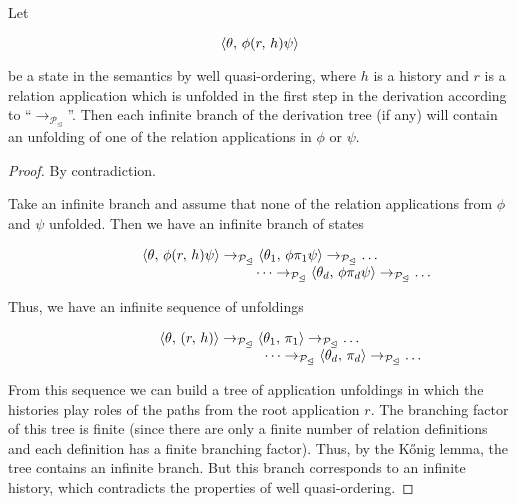 \begin{lemma}
  \label{lem:one-step-liveness}
  Let

  \[
  \langle \theta,\, \phi (r,\, h) \psi \rangle
  \]

  be a state in the semantics by well quasi-ordering, where $h$ is a history and $r$ is a relation application which
  is unfolded in the first step in the derivation according to  ``$\rightarrow_{\mathcal{P}_\trianglelefteq}$''. Then each infinite branch
  of the derivation tree (if any) will contain an unfolding of one of the relation applications in $\phi$ or $\psi$.
\end{lemma}
\begin{proof}
By contradiction.

Take an infinite branch and assume that none of the relation applications from $\phi$ and $\psi$ unfolded.
Then we have an infinite branch of states

     \[
     \begin{array}{c}
     \langle \theta,\, \phi (r,\, h) \psi \rangle \rightarrow_{\mathcal{P}_\trianglelefteq} \langle \theta_1,\, \phi \pi_1 \psi \rangle \rightarrow_{\mathcal{P}_\trianglelefteq} \dots \\
     \phantom{XXXXXXXXXXXXX}\dots\rightarrow_{\mathcal{P}_\trianglelefteq} \langle \theta_d,\, \phi \pi_d \psi \rangle \rightarrow_{\mathcal{P}_\trianglelefteq} \dots
     \end{array}
     \]      

Thus, we have an infinite sequence of unfoldings

\[
\begin{array}{c}
\langle \theta,\,(r,\,h) \rangle\to_{\mathcal{P}_\trianglelefteq}\langle \theta_1,\,\pi_1 \rangle\to_{\mathcal{P}_\trianglelefteq}\dots\\
\phantom{XXXXXXXXXXXXX}\dots\to_{\mathcal{P}_\trianglelefteq}\langle \theta_d,\,\pi_d \rangle\to_{\mathcal{P}_\trianglelefteq}\dots
\end{array}
\]

From this sequence we can build a tree of application unfoldings in which the histories play roles of
the paths from the root application $r$. The branching factor of this tree is finite (since there are only a finite number of
relation definitions and each definition has a finite branching factor). Thus, by the K\H{o}nig lemma, the tree contains
an infinite branch. But this branch corresponds to an infinite history, which contradicts the properties of well
quasi-ordering. 
\end{proof}

